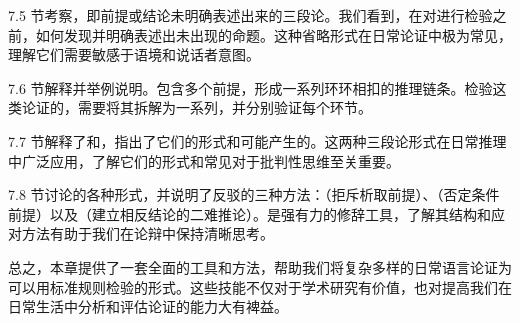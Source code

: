 7.5 节考察，即前提或结论未明确表述出来的三段论。我们看到，在对进行检验之前，如何发现并明确表述出未出现的命题。这种省略形式在日常论证中极为常见，理解它们需要敏感于语境和说话者意图。

7.6 节解释并举例说明。包含多个前提，形成一系列环环相扣的推理链条。检验这类论证的，需要将其拆解为一系列，并分别验证每个环节。

7.7 节解释了和，指出了它们的形式和可能产生的。这两种三段论形式在日常推理中广泛应用，了解它们的形式和常见对于批判性思维至关重要。

7.8 节讨论的各种形式，并说明了反驳的三种方法：（拒斥析取前提）、（否定条件前提）以及（建立相反结论的二难推论）。是强有力的修辞工具，了解其结构和应对方法有助于我们在论辩中保持清晰思考。

总之，本章提供了一套全面的工具和方法，帮助我们将复杂多样的日常语言论证为可以用标准规则检验的形式。这些技能不仅对于学术研究有价值，也对提高我们在日常生活中分析和评估论证的能力大有裨益。

\printbibliography[heading=subbibliography,title={第7章参考文献}]